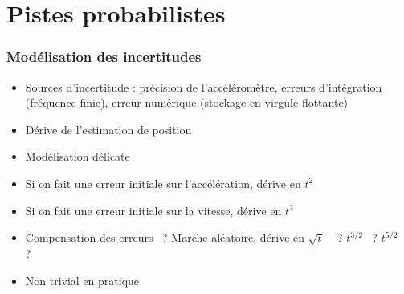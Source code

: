 \documentclass[11pt]{beamer}
\begin{document}
\section{Pistes probabilistes}
\begin{frame}
  \frametitle{Modélisation des incertitudes}
\begin{itemize}
\item Sources d'incertitude : précision de l'accéléromètre, erreurs
  d'intégration (fréquence finie), erreur numérique (stockage en
  virgule flottante)
\item Dérive de l'estimation de position
\item Modélisation délicate
\item Si on fait une erreur initiale sur l'accélération, dérive en
  $t^{2}$
\item Si on fait une erreur initiale sur la vitesse, dérive en
  $t^{2}$
\item Compensation des erreurs~ ? Marche aléatoire, dérive en $\sqrt t$
 ~ ? $t^{3/2}$~ ? $t^{5/2}$~ ?
\item Non trivial en pratique
\end{itemize}
\end{frame}
\end{document}
